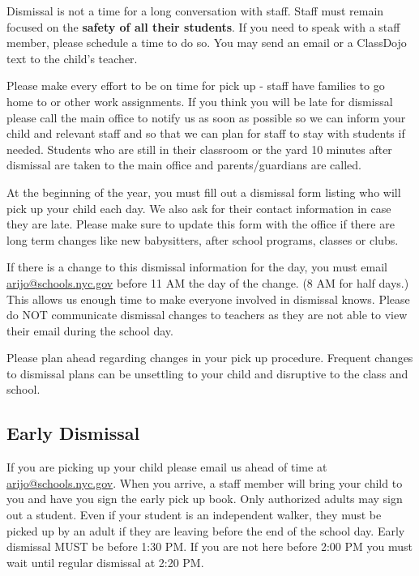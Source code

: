 \documentclass[11pt, letterpaper]{article}
\begin{document}
Dismissal is not a time for a long conversation with staff. Staff must remain focused on the \textbf{safety of all their students}. If you need to speak with a staff member, please schedule a time to do so. You may send an email or a ClassDojo text to the child's teacher.

Please make every effort to be on time for pick up - staff have families to go home to or other work assignments. If you think you will be late for dismissal please call the main office to notify us as soon as possible so we can inform your child and relevant staff and so that we can plan for staff to stay with students if needed. Students who are still in their classroom or the yard 10 minutes after dismissal are taken to the main office and parents/guardians are called.

At the beginning of the year, you must fill out a dismissal form listing who will pick up your child each day. We also ask for their contact information in case they are late. Please make sure to update this form with the office if there are long term changes like new babysitters, after school programs, classes or clubs.

If there is a change to this dismissal information for the day, you must email \href{mailto:arijo@schools.nyc.gov}{arijo@schools.nyc.gov} before 11 AM the day of the change. (8 AM for half days.) This allows us enough time to make everyone involved in dismissal knows. Please do NOT communicate dismissal changes to teachers as they are not able to view their email during the school day.

Please plan ahead regarding changes in your pick up procedure. Frequent changes to dismissal plans can be unsettling to your child and disruptive to the class and school. 

\subsection{Early Dismissal}
If you are picking up your child please email us ahead of time at
\href{mailto:arijo@schools.nyc.gov}{arijo@schools.nyc.gov}. When you arrive, a staff member will bring your child to you and have you sign the early pick up book. Only authorized adults may sign out a student. Even if your student is an independent walker, they must be picked up by an adult if they are leaving before the end of the school day. Early dismissal MUST be before 1:30 PM. If you are not here before 2:00 PM you must wait until regular dismissal at 2:20 PM.
\end{document}
